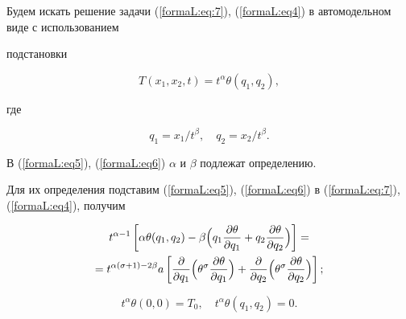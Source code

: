 Будем искать решение задачи (\ref{formaL:eq:7}), (\ref{formaL:eq4}) в автомодельном виде с использованием 

подстановки

\begin{equation}

\label{formaL:eq5}

T(x_1 , x_2 , t)=t^\alpha \theta (q_1 , q_2 ),

\end{equation}

где

\begin{equation}

\label{formaL:eq6}

q_1 =x_1 /t^\beta , \quad 

q_2 =x_2 /t^\beta .

\end{equation}

В (\ref{formaL:eq5}), (\ref{formaL:eq6}) $\alpha $ и $\beta $ подлежат определению. 

Для их определения подставим (\ref{formaL:eq5}), (\ref{formaL:eq6}) в (\ref{formaL:eq:7}), (\ref{formaL:eq4}), получим

\begin{multline}

\label{formaL:eq7}

t^{\alpha -1}\left[ {\alpha \theta (q_1 ,q_2 )-\beta 

\Bigl(q_1 \frac{\partial \theta }{\partial q_1 }+q_2 \frac{\partial \theta }{\partial q_2 }\Bigr)} \right]= \\=

t^{\alpha (\sigma +1)-2\beta }a\left[ {\frac{\partial }{\partial q_1 }

\Bigl( \theta ^\sigma \frac{\partial \theta }{\partial q_1 } \Bigr)+

\frac{\partial }{\partial q_2 }\Bigl(\theta ^\sigma \frac{\partial \theta }{\partial q_2 } \Bigr)} \right];

\end{multline}

\begin{equation}

t^\alpha \theta (0,0)=T_0 ,

\quad 

\label{formaL:eq9}

t^\alpha \theta (q_1 ,q_2 )=0.

\end{equation}

